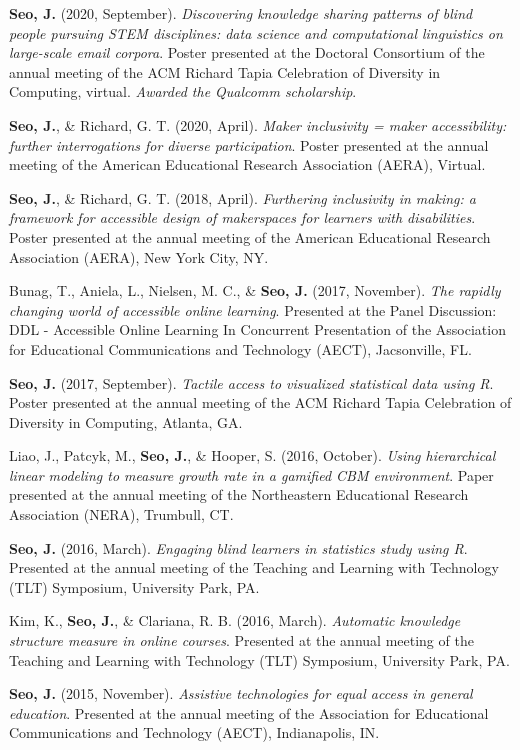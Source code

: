 \documentclass[11pt,a4paper,]{awesome-cv}
\begin{document}
\textbf{Seo, J.} (2020, September). \emph{Discovering knowledge sharing
    patterns of blind people pursuing STEM disciplines: data science and
    computational linguistics on large-scale email corpora}. Poster
presented at the Doctoral Consortium of the annual meeting of the ACM
Richard Tapia Celebration of Diversity in Computing, virtual.
\emph{Awarded the Qualcomm scholarship}.

\textbf{Seo, J.}, \& Richard, G. T. (2020, April). \emph{Maker
    inclusivity = maker accessibility: further interrogations for diverse
    participation}. Poster presented at the annual meeting of the American
Educational Research Association (AERA), Virtual.

\textbf{Seo, J.}, \& Richard, G. T. (2018, April). \emph{Furthering
    inclusivity in making: a framework for accessible design of makerspaces
    for learners with disabilities}. Poster presented at the annual meeting
of the American Educational Research Association (AERA), New York City,
NY.

Bunag, T., Aniela, L., Nielsen, M. C., \& \textbf{Seo, J.} (2017,
November). \emph{The rapidly changing world of accessible online
    learning}. Presented at the Panel Discussion: DDL - Accessible Online
Learning In Concurrent Presentation of the Association for Educational
Communications and Technology (AECT), Jacsonville, FL.

\textbf{Seo, J.} (2017, September). \emph{Tactile access to visualized
    statistical data using R}. Poster presented at the annual meeting of the
ACM Richard Tapia Celebration of Diversity in Computing, Atlanta, GA.

Liao, J., Patcyk, M., \textbf{Seo, J.}, \& Hooper, S. (2016, October).
\emph{Using hierarchical linear modeling to measure growth rate in a
    gamified CBM environment}. Paper presented at the annual meeting of the
Northeastern Educational Research Association (NERA), Trumbull, CT.

\textbf{Seo, J.} (2016, March). \emph{Engaging blind learners in
    statistics study using R}. Presented at the annual meeting of the
Teaching and Learning with Technology (TLT) Symposium, University Park,
PA.

Kim, K., \textbf{Seo, J.}, \& Clariana, R. B. (2016, March).
\emph{Automatic knowledge structure measure in online courses}.
Presented at the annual meeting of the Teaching and Learning with
Technology (TLT) Symposium, University Park, PA.

\textbf{Seo, J.} (2015, November). \emph{Assistive technologies for
    equal access in general education}. Presented at the annual meeting of
the Association for Educational Communications and Technology (AECT),
Indianapolis, IN.
\end{document}
